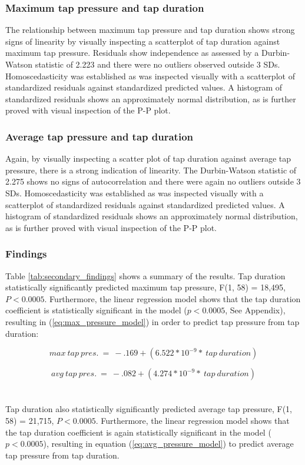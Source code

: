 \documentclass{sigchi}
\begin{document}
\subsubsection{Maximum tap pressure and tap duration}
The relationship between maximum tap pressure and tap duration shows strong signs of linearity by visually inspecting a scatterplot of tap duration against maximum tap pressure. Residuals show independence as assessed by a Durbin-Watson statistic of 2.223 and there were no outliers observed outside 3 SDs. Homoscedasticity was established as was inspected visually with a scatterplot of standardized residuals against standardized predicted values. A histogram of standardized residuals shows an approximately normal distribution, as is further proved with visual inspection of the P-P plot.

\subsubsection{Average tap pressure and tap duration}
Again, by visually inspecting a scatter plot of tap duration against average tap pressure, there is a strong indication of linearity. The Durbin-Watson statistic of 2.275 shows no signs of autocorrelation and there were again no outliers outside 3 SDs. Homoscedasticity was established as was inspected visually with a scatterplot of standardized residuals against standardized predicted values. A histogram of standardized residuals shows an approximately normal distribution, as is further proved with visual inspection of the P-P plot.

\subsubsection{Findings}

Table \ref{tab:secondary_findings} shows a summary of the results. Tap duration statistically significantly predicted maximum tap pressure, F(1, 58) = 18,495, $P < 0.0005$. Furthermore, the linear regression model shows that the tap duration coefficient is statistically significant in the model ($p < 0.0005$, See Appendix), resulting in (\ref{eq:max_pressure_model}) in order to predict tap pressure from tap duration:

\begin{equation}
max\ tap\ pres.\ =\ -.169 + (6.522*10^{-9} *\ tap\ duration)
\label{eq:max_pressure_model}
\end{equation}

\begin{equation}
avg\ tap\ pres.\ =\ -.082 + (4.274*10^{-9} *\ tap\ duration)
\label{eq:avg_pressure_model}
\end{equation}
\\\\
Tap duration also statistically significantly predicted average tap pressure, F(1, 58) = 21,715, $P < 0.0005$. Furthermore, the linear regression model shows that the tap duration coefficient is again statistically significant in the model ($p < 0.0005$), resulting in equation (\ref{eq:avg_pressure_model}) to predict average tap pressure from tap duration.
\end{document}
